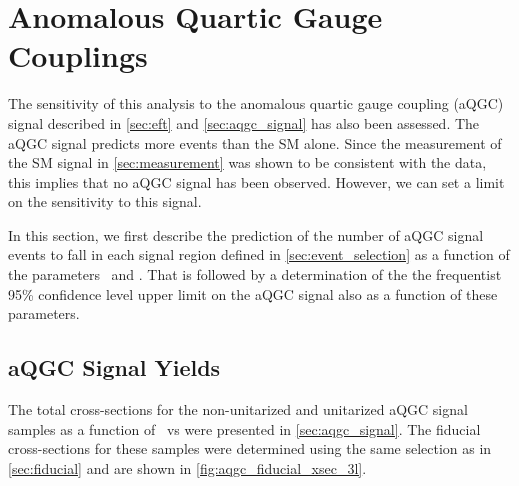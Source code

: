 \section{Anomalous Quartic Gauge Couplings}
\label{sec:aqgc_limit}

The sensitivity of this analysis to the anomalous quartic gauge coupling
(aQGC) signal described in \sec\ref{sec:eft} and 
\sec\ref{sec:aqgc_signal} has also been assessed.  The aQGC signal predicts
more events than the SM alone. Since the measurement of the SM signal in
\sec\ref{sec:measurement} was shown to be consistent with the data, this implies
that no aQGC signal has been observed. However, we can set a limit on the sensitivity 
to this signal.

In this section, we first describe the prediction of the number of aQGC signal events
to fall in each signal region defined in \sec\ref{sec:event_selection} as a function
of the parameters \fszero~and \fsone. That is followed by 
a determination of the the frequentist 95\% confidence level upper limit on the aQGC
signal also as a function of these parameters. 

\subsection{aQGC Signal Yields}
The total cross-sections for the non-unitarized and unitarized aQGC
signal samples as a function of \fszero~vs \fsone 
were presented in \sec\ref{sec:aqgc_signal}.
The fiducial cross-sections for these samples were determined using 
the same selection as in \sec\ref{sec:fiducial} and are shown in 
\fig\ref{fig:aqgc_fiducial_xsec_3l}.

